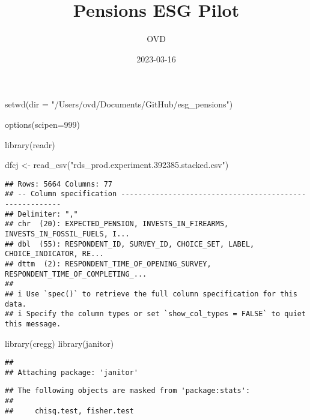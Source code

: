 \documentclass[
]{article}
\title{Pensions ESG Pilot}
\author{OVD}
\date{2023-03-16}
\newenvironment{Shaded}{\begin{snugshade}}{\end{snugshade}}
\newcommand{\AttributeTok}[1]{\textcolor[rgb]{0.77,0.63,0.00}{#1}}
\newcommand{\DecValTok}[1]{\textcolor[rgb]{0.00,0.00,0.81}{#1}}
\newcommand{\FunctionTok}[1]{\textcolor[rgb]{0.00,0.00,0.00}{#1}}
\newcommand{\NormalTok}[1]{#1}
\newcommand{\OtherTok}[1]{\textcolor[rgb]{0.56,0.35,0.01}{#1}}
\newcommand{\StringTok}[1]{\textcolor[rgb]{0.31,0.60,0.02}{#1}}
\begin{document}
\maketitle

\begin{Shaded}
\begin{Highlighting}[]
\FunctionTok{setwd}\NormalTok{(}\AttributeTok{dir =} \StringTok{"/Users/ovd/Documents/GitHub/esg\_pensions"}\NormalTok{)}

\FunctionTok{options}\NormalTok{(}\AttributeTok{scipen=}\DecValTok{999}\NormalTok{)}
\end{Highlighting}
\end{Shaded}

\begin{Shaded}
\begin{Highlighting}[]
\FunctionTok{library}\NormalTok{(readr)}

\NormalTok{dfcj }\OtherTok{\textless{}{-}} \FunctionTok{read\_csv}\NormalTok{(}\StringTok{"rds\_prod.experiment.392385.stacked.csv"}\NormalTok{)}
\end{Highlighting}
\end{Shaded}

\begin{verbatim}
## Rows: 5664 Columns: 77
## -- Column specification --------------------------------------------------------
## Delimiter: ","
## chr  (20): EXPECTED_PENSION, INVESTS_IN_FIREARMS, INVESTS_IN_FOSSIL_FUELS, I...
## dbl  (55): RESPONDENT_ID, SURVEY_ID, CHOICE_SET, LABEL, CHOICE_INDICATOR, RE...
## dttm  (2): RESPONDENT_TIME_OF_OPENING_SURVEY, RESPONDENT_TIME_OF_COMPLETING_...
## 
## i Use `spec()` to retrieve the full column specification for this data.
## i Specify the column types or set `show_col_types = FALSE` to quiet this message.
\end{verbatim}

\begin{Shaded}
\begin{Highlighting}[]
\FunctionTok{library}\NormalTok{(cregg)}
\FunctionTok{library}\NormalTok{(janitor)}
\end{Highlighting}
\end{Shaded}

\begin{verbatim}
## 
## Attaching package: 'janitor'
\end{verbatim}

\begin{verbatim}
## The following objects are masked from 'package:stats':
## 
##     chisq.test, fisher.test
\end{verbatim}
\end{document}
